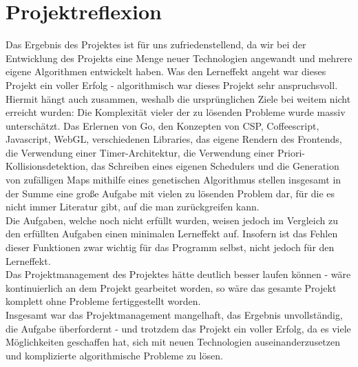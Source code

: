 \section{Projektreflexion}
Das Ergebnis des Projektes ist für uns zufriedenstellend, da wir bei der Entwicklung des Projekts eine Menge neuer Technologien angewandt und mehrere eigene Algorithmen entwickelt haben. Was den Lerneffekt angeht war dieses Projekt ein voller Erfolg - algorithmisch war dieses Projekt sehr anspruchsvoll. \\
Hiermit hängt auch zusammen, weshalb die ursprünglichen Ziele bei weitem nicht erreicht wurden: Die Komplexität vieler der zu lösenden Probleme wurde massiv unterschätzt. Das Erlernen von Go, den Konzepten von CSP, Coffeescript, Javascript, WebGL, verschiedenen Libraries, das eigene Rendern des Frontends, die Verwendung einer Timer-Architektur, die Verwendung einer Priori-Kollisionsdetektion, das Schreiben eines eigenen Schedulers und die Generation von zufälligen Maps mithilfe eines genetischen Algorithmus stellen insgesamt in der Summe eine große Aufgabe mit vielen zu lösenden Problem dar, für die es nicht immer Literatur gibt, auf die man zurückgreifen kann. \\
Die Aufgaben, welche noch nicht erfüllt wurden, weisen jedoch im Vergleich zu den erfüllten Aufgaben einen minimalen Lerneffekt auf. Insofern ist das Fehlen dieser Funktionen zwar wichtig für das Programm selbst, nicht jedoch für den Lerneffekt. \\
Das Projektmanagement des Projektes hätte deutlich besser laufen können - wäre kontinuierlich an dem Projekt gearbeitet worden, so wäre das gesamte Projekt komplett ohne Probleme fertiggestellt worden. \\
Insgesamt war das Projektmanagement mangelhaft, das Ergebnis unvollständig, die Aufgabe überfordernt - und trotzdem das Projekt ein voller Erfolg, da es viele Möglichkeiten geschaffen hat, sich mit neuen Technologien auseinanderzusetzen und komplizierte algorithmische Probleme zu lösen.